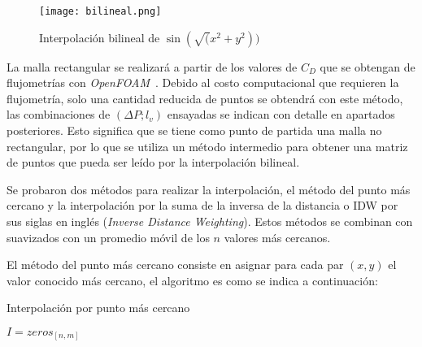 \begin{figure}
    \centering
    \texttt{[image: bilineal.png]}
    \caption{Interpolación bilineal de $\sin(\sqrt(x^2 +
    y^2))$}\label{fig:bilineal}
\end{figure}

La malla rectangular se realizará a partir de los valores de $C_D$ que se
obtengan de flujometrías con \emph{OpenFOAM}~\parencite{openfoam}.
%
Debido al costo computacional que requieren la flujometría, solo una cantidad
reducida de puntos se obtendrá con este método, las combinaciones de $(\Delta
P; l_v)$ ensayadas se indican con detalle en apartados posteriores.
%
Esto significa que se tiene como punto de partida una malla no rectangular, por
lo que se utiliza un método intermedio para obtener una matriz de puntos que
pueda ser leído por la interpolación bilineal.

Se probaron dos métodos para realizar la interpolación, el método del punto más
cercano y la interpolación por la suma de la inversa de la distancia o IDW por
sus siglas en inglés (\emph{Inverse Distance Weighting}).
%
Estos métodos se combinan con suavizados con un promedio móvil de los $n$
valores más cercanos.

El método del punto más cercano consiste en asignar para cada par $(x, y)$ el
valor conocido más cercano, el algoritmo es como se indica a continuación:

\begin{algorithm}
 \caption{Interpolación por punto más cercano}\label{algo:mas_cercano}
    \SetAlgoLined



    \BlankLine
     $I=zeros_{[n,m]}$\;
\end{algorithm}

